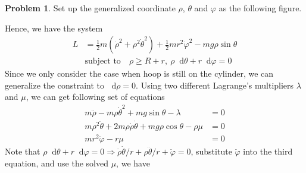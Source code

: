 \documentclass[twoside,11pt]{article}
\newcommand{\lms}{\fontfamily{lmss}\selectfont} %
\renewcommand*\d{\mathop{}\!\mathrm{d}}
\theoremstyle{definition}
\newtheorem{problem}{\lms Problem}
\theoremstyle{remark}
\begin{document}
\newpage
\begin{problem}
Set up the generalized coordinate $\rho$, $\theta$ and $\varphi$ as the following figure.
\begin{figure}[H]
    \centering
\end{figure}
Hence, we have the system 
\begin{align*}
    L &= \frac{1}{2}m(\dot{\rho}^2 + \rho^2\dot{\theta}^2)
    + \frac{1}{2}mr^2\dot{\varphi}^2 - mg\rho\sin\theta\\
    & \text{subject to}\quad \rho\geq R+r,~\rho\d\theta + r\d\varphi = 0
\end{align*}
Since we only consider the case when hoop is still on the cylinder, 
we can generalize the constraint to $\d\rho = 0$.
Using two different Lagrange's multipliers $\lambda$ and $\mu$,
we can get following set of equations
\begin{align*}
    m\ddot{\rho} - m\rho\dot{\theta}^2 + mg\sin\theta - \lambda &= 0\\
    m\rho^2\ddot{\theta} + 2m\rho\dot{\rho}\dot{\theta} + mg\rho\cos\theta
    -\rho\mu &= 0\\
    mr^2\ddot{\varphi} - r\mu &= 0
\end{align*}
Note that $\rho\d\theta + r\d\varphi = 0
\Rightarrow \dot{\rho}\dot{\theta}/r + \rho\ddot{\theta}/r + \ddot{\varphi}=0$,
substitute $\ddot{\varphi}$ into the third equation, and use the solved $\mu$, we have
\begin{align*}

\end{align*}
\end{problem}
\end{document}

